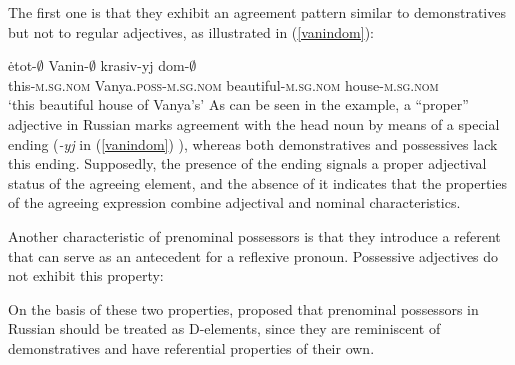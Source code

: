\documentclass[output=paper,colorlinks,citecolor=brown]{langscibook}
\begin{document}

The first one is that they exhibit an agreement pattern similar to demonstratives but not to regular adjectives, as illustrated in (\ref{vanindom}):

\ea 	\label{vanindom} \gll 
\.{e}tot-$\emptyset$	Vanin-$\emptyset$			krasiv-yj dom-$\emptyset$ \\
this-\textsc{m.sg.nom} 	Vanya.\textsc{poss-m.sg.nom} 	beautiful-\textsc{m.sg.nom} house-\textsc{m.sg.nom}\\
\glt `this beautiful house of Vanya's'							 
\z
\noindent As can be seen in the example, a ``proper'' adjective in Russian marks agreement with the head noun by means of a special ending (\textit{-yj} in (\ref{vanindom}) %
), whereas both demonstratives and possessives lack this ending. Supposedly, the presence of the ending signals a proper adjectival status of the agreeing element, and the absence of it indicates that the properties of the agreeing expression combine adjectival and nominal characteristics. 

Another characteristic of prenominal possessors is that they introduce a referent that can serve as an antecedent for a reflexive pronoun. Possessive adjectives do not exhibit this property: 

\ea 	
{}
\z
\z
\noindent On the basis of these two properties, \citet{babyonyshev97} proposed that prenominal possessors in Russian should be treated as D-elements, since they are reminiscent of demonstratives and have referential properties of their own. 
\end{document}
